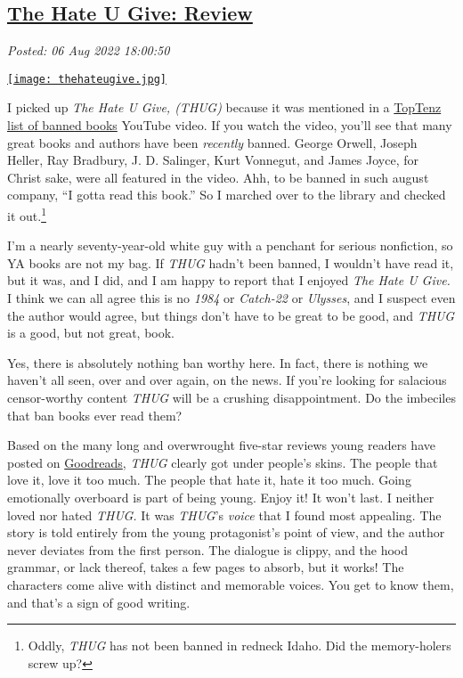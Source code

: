 %

\subsection*{\href{http://analyzethedatanotthedrivel.org/2022/08/06/the-hate-u-give-review/}{The Hate U Give: Review}}


\noindent\emph{Posted: 06 Aug 2022 18:00:50}
\vspace{6pt}


\captionsetup[floatingfigure]{labelformat=empty}
\begin{floatingfigure}[l]{0.21\textwidth}
\centering
\href{https://www.goodreads.com/book/show/58651625-the-hate-u-give}{\texttt{[image: thehateugive.jpg]}}
\label{fig:7452x0}
\end{floatingfigure}  I picked up \emph{The Hate U Give, (THUG)} because it was mentioned in a
\href{https://www.youtube.com/watch?v=5Gcfi-0vPAM}{TopTenz list of banned books} YouTube 
video. If you watch the video, you'll see that
many great books and authors have been \emph{recently} banned. George
Orwell, Joseph Heller, Ray Bradbury, J. D. Salinger, Kurt Vonnegut, and
James Joyce, for Christ sake, were all featured in the video. Ahh, to be
banned in such august company, ``I gotta read this book.'' So I marched
over to the library and checked it
out.\footnote{Oddly, \emph{THUG} has not been banned in redneck Idaho. Did the
  memory-holers screw up?}

I'm a nearly seventy-year-old white guy with a penchant for serious
nonfiction, so YA books are not my bag. If \emph{THUG} hadn't been
banned, I wouldn't have read it, but it was, and I did, and I am happy
to report that I enjoyed \emph{The Hate U Give.} I think we can all
agree this is no \emph{1984} or \emph{Catch-22} or \emph{Ulysses}, and I
suspect even the author would agree, but things don't have to be great
to be good, and \emph{THUG} is a good, but not great, book.

Yes, there is absolutely nothing ban worthy here. In fact, there is
nothing we haven't all seen, over and over again, on the news. If you're
looking for salacious censor-worthy content \emph{THUG} will be a
crushing disappointment. Do the imbeciles that ban books ever read them?

Based on the many long and overwrought five-star reviews young readers
have posted on
\href{https://www.goodreads.com/book/show/58651625-the-hate-u-give}{Goodreads},
\emph{THUG} clearly got under people's skins. The people that love it,
love it too much. The people that hate it, hate it too much. Going
emotionally overboard is part of being young. Enjoy it! It won't last. I
neither loved nor hated \emph{THUG.} It was \emph{THUG}'s \emph{voice}
that I found most appealing. The story is told entirely from the young
protagonist's point of view, and the author never deviates from the
first person. The dialogue is clippy, and the hood grammar, or lack
thereof, takes a few pages to absorb, but it works! The characters come
alive with distinct and memorable voices. You get to know them, and
that's a sign of good writing.

